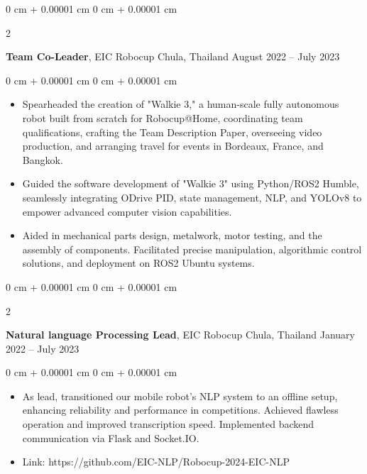 \documentclass[10pt, letterpaper]{article}
\newenvironment{highlights}{
    \begin{itemize}[
        topsep=0.0 cm,
        parsep=0.0 cm,
        partopsep=0pt,
        itemsep=0pt,
        leftmargin=0 cm + 10pt
    ]
}{
    \end{itemize}
} %
\newenvironment{onecolentry}{
    \begin{adjustwidth}{
        0 cm + 0.00001 cm
    }{
        0 cm + 0.00001 cm
    }
}{
    \end{adjustwidth}
} %
\newenvironment{twocolentry}[2][]{
    \onecolentry
    \def\secondColumn{#2}
    \setcolumnwidth{\fill, 4.5 cm}
    \begin{paracol}{2}
}{
    \switchcolumn \raggedleft \secondColumn
    \end{paracol}
    \endonecolentry
} %
\begin{document}
        \vspace{0.2 cm}
        \begin{twocolentry}{August 2022 – July 2023}
        \textbf{Team Co-Leader}, EIC Robocup Chula, Thailand\end{twocolentry}
        \vspace{0.10 cm}
        \begin{onecolentry}\begin{highlights}
            \item Spearheaded the creation of "Walkie 3," a human-scale fully autonomous robot built from scratch for Robocup@Home, coordinating team qualifications, crafting the Team Description Paper, overseeing video production, and arranging travel for events in Bordeaux, France, and Bangkok.
            \item Guided the software development of "Walkie 3" using Python/ROS2 Humble, seamlessly integrating ODrive PID, state management, NLP, and YOLOv8 to empower advanced computer vision capabilities.
            \item Aided in mechanical parts design, metalwork, motor testing, and the assembly of components. Facilitated precise manipulation, algorithmic control solutions, and deployment on ROS2 Ubuntu systems.
        \end{highlights}\end{onecolentry}

        \vspace{0.2 cm}
        \begin{twocolentry}{January 2022 – July 2023}
        \textbf{Natural language Processing Lead}, EIC Robocup Chula, Thailand\end{twocolentry}
        \vspace{0.10 cm}
        \begin{onecolentry}\begin{highlights}
            \item As lead, transitioned our mobile robot's NLP system to an offline setup, enhancing reliability and performance in competitions. Achieved flawless operation and improved transcription speed. Implemented backend communication via Flask and Socket.IO.
            \item Link: https://github.com/EIC-NLP/Robocup-2024-EIC-NLP

        \end{highlights}\end{onecolentry}
\end{document}
